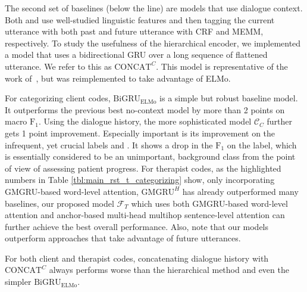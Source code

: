 The second set of baselines (below the line) are models that use
dialogue context.  Both \citet{can2015dialog} and
\citet{tanana2016comparison} use well-studied linguistic features and
then tagging the current utterance with both past and future utterance
with CRF and MEMM, respectively. To study the usefulness of the
hierarchical encoder, we implemented a model that uses a bidirectional
GRU over a long sequence of flattened utterance. We refer to this as
$\text{CONCAT}^{C}$. This model is representative of the work
of~\citet{huang2018modeling}, but was reimplemented to take advantage
of ELMo.




For categorizing client codes, $\text{BiGRU}_{\text{ELMo}}$ is a
simple but robust baseline model. It outperforms the previous
best no-context model by more than 2 points on macro $\text{F}_{1}$. Using the
dialogue history, the more sophisticated model $\mathcal{C}_{C}$
further gets 1 point improvement. Especially important is its
improvement on the infrequent, yet crucial labels \CHANGE and
\SUSTAIN. It shows a drop in the $\text{F}_{1}$ on the \FN label, which is
essentially considered to be an unimportant, background class from
the point of view of assessing patient progress.
%
For therapist codes, as the highlighted numbers in Table
\ref{tbl:main_rst_t_categorizing} show, only incorporating GMGRU-based
word-level attention, $\text{GMGRU}^{H}$ has already outperformed many
baselines, our proposed model $\mathcal{F}_{T}$ which uses both
GMGRU-based word-level attention and anchor-based multi-head multihop
sentence-level attention can further achieve the best overall
performance. Also, note that our models outperform approaches
that take advantage of future utterances.

For both client and therapist codes, concatenating dialogue history
with $\text{CONCAT}^{C}$ always performs worse than the hierarchical
method and even the simpler $\text{BiGRU}_{\text{ELMo}}$.

